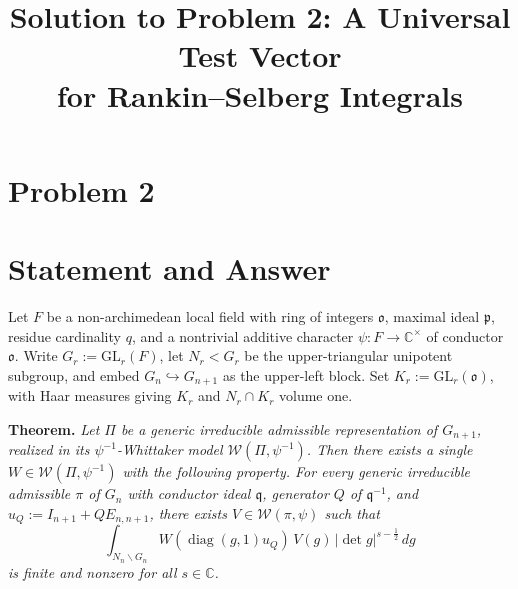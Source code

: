 \clearpage
\section*{Problem 2}
\begingroup
\hypersetup{colorlinks=true,
            linkcolor=blue!50!black,
            citecolor=blue!50!black,
            urlcolor=blue!50!black}
\newcommand{\qtwoF}{F}
\newcommand{\qtwooo}{\mathfrak{o}}
\newcommand{\qtwopp}{\mathfrak{p}}
\newcommand{\qtwoqq}{\mathfrak{q}}
\newcommand{\qtwoC}{\mathbb{C}}
\newcommand{\qtwoZ}{\mathbb{Z}}
\newcommand{\qtwoGL}{\mathrm{GL}}
\newcommand{\qtwoMn}{M_n}
\newcommand{\qtwoSe}{\mathcal{S}_{\mathrm e}}
\newcommand{\qtwoSw}{\mathcal{S}}
\newcommand{\qtwoW}{\mathcal{W}}
\newcommand{\qtwovol}{\operatorname{vol}}
\newcommand{\qtwodiag}{\operatorname{diag}}
\newcommand{\qtwotr}{\operatorname{trace}}
\newcommand{\qtwottilde}[1]{\widetilde{#1}}
\newcommand{\qtwolRS}{\ell_{\mathrm{RS}}}
\newtheorem{qtwotheorem}{Theorem}
\newtheorem{qtwolemma}{Lemma}
\newtheorem{qtwoproposition}{Proposition}
\newtheorem{qtwocorollary}{Corollary}
\title{Solution to Problem 2: A Universal Test Vector\\
for Rankin--Selberg Integrals}
\author{}
\date{}
\maketitle


\section*{Statement and Answer}

Let $\qtwoF$ be a non-archimedean local field with ring of integers $\qtwooo$, maximal
ideal $\qtwopp$, residue cardinality $q$, and a nontrivial additive character
$\psi:\qtwoF\to\qtwoC^\times$ of conductor $\qtwooo$. Write $G_r:=\qtwoGL_r(\qtwoF)$, let $N_r<G_r$
be the upper-triangular unipotent subgroup, and embed $G_n\hookrightarrow
G_{n+1}$ as the upper-left block. Set $K_r:=\qtwoGL_r(\qtwooo)$, with Haar measures
giving $K_r$ and $N_r\cap K_r$ volume one.

\medskip
\noindent\textbf{Theorem.} \emph{Let $\Pi$ be a generic irreducible admissible
representation of $G_{n+1}$, realized in its $\psi^{-1}$-Whittaker model
$\qtwoW(\Pi,\psi^{-1})$. Then there exists a single $W\in\qtwoW(\Pi,\psi^{-1})$ with the
following property. For every generic irreducible admissible $\pi$ of $G_n$ with
conductor ideal $\qtwoqq$, generator $Q$ of $\qtwoqq^{-1}$, and
$u_Q:=I_{n+1}+QE_{n,n+1}$, there exists $V\in\qtwoW(\pi,\psi)$ such that}
\[
\int_{N_n\backslash G_n} W(\qtwodiag(g,1)u_Q)\,V(g)\,|\det g|^{s-\frac12}\,dg
\]
\emph{is finite and nonzero for all $s\in\qtwoC$.}

